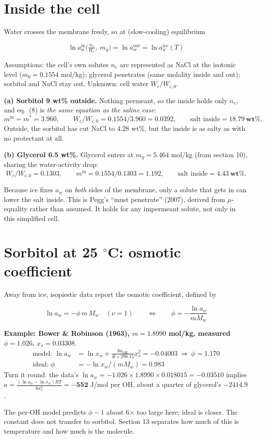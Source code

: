 \documentclass[11pt,a4paper]{article}
\newcommand{\aoh}{a_{\mathrm{OH}}}
\newcommand{\aice}{\ln a_w^{\mathrm{ice}}}
\begin{document}
\section{Inside the cell}
Water crosses the membrane freely, so at (slow-cooling) equilibrium
\begin{eqbox}
\[ \ln a_w^{\mathrm{in}}\Big(\tfrac{n_c}{W_c},\ m_g\Big)=\ln a_w^{\mathrm{out}}=\aice(T)\tag{8}\]
\end{eqbox}
Assumptions: the cell's own solutes $n_c$ are represented as NaCl at the isotonic level ($m_0=0.1554$ mol/kg);
glycerol penetrates (same molality inside and out); sorbitol and NaCl stay out. Unknown: cell water $W_c/W_{c,0}$.

\textbf{(a) Sorbitol 9 wt\% outside.} Nothing permeant, so the inside holds only $n_c$, and eq.~(8) is \emph{the same equation
as the saline case}:
\[ m^{\mathrm{in}}=m^{*}=3.960,\qquad W_c/W_{c,0}=0.1554/3.960=0.0392,\qquad \text{salt inside}=\mathbf{18.79\ wt\%}. \]
Outside, the sorbitol has cut NaCl to $4.28$ wt\%, but the inside is as salty as with no protectant at all.

\textbf{(b) Glycerol 6.5 wt\%.} Glycerol enters at $m_g=5.464$ mol/kg (from section 10), sharing the water-activity drop:
\[ W_c/W_{c,0}=0.1303,\qquad m^{\mathrm{in}}=0.1554/0.1303=1.192,\qquad \text{salt inside}=\mathbf{4.43\ wt\%}. \]
\begin{result}
Because ice fixes $a_w$ on \emph{both} sides of the membrane, only a solute that gets in can lower the salt inside. This is
Pegg's ``must penetrate'' (2007), derived from $\mu$-equality rather than assumed. It holds for any impermeant solute,
not only in this simplified cell.
\end{result}

\section{Sorbitol at 25 $^\circ$C: osmotic coefficient}
Away from ice, isopiestic data report the osmotic coefficient, defined by
\begin{eqbox}
\[ \ln a_w=-\phi\, m\, M_w\quad(\nu=1)\qquad\Leftrightarrow\qquad \phi=-\frac{\ln a_w}{mM_w}\tag{9}\]
\end{eqbox}
\textbf{Example: Bower \& Robinson (1963), $m=1.8990$ mol/kg, measured $\phi=1.026$.} $x_s=0.03308$.
\begin{align*}
\text{model: }\ln a_w&=\ln x_w+\frac{6\aoh}{R\times298.15}x_s^2=-0.04003\ \Rightarrow\ \phi=\mathbf{1.170}\\
\text{ideal: }\phi&=-\ln x_w/(mM_w)=0.983
\end{align*}
Turn it round: the data's $\ln a_w=-1.026\times1.8990\times0.018015=-0.03510$ implies
$a=\frac{(\ln a_w-\ln x_w)RT}{6x_s^2}=\mathbf{-552}$ J/mol per OH, about a quarter of glycerol's $-2414.9$.
\begin{result}
The per-OH model predicts $\phi-1$ about 6$\times$ too large here; ideal is closer. The constant does not transfer to sorbitol.
Section 13 separates how much of this is temperature and how much is the molecule.
\end{result}
\end{document}
